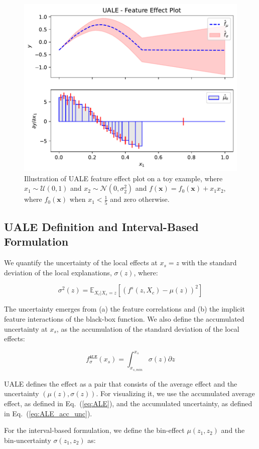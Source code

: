 \documentclass[twoside]{article}
\newcommand{\dfdx}{f^s}
\newcommand{\xb}{\mathbf{x}}
\begin{document}
\begin{figure}
  \centering
  \includegraphics[width=.4\textwidth]{concept_figure/fig-1.pdf}
  \caption{Illustration of UALE feature effect plot on a toy example,
    where \(x_1 \sim \mathcal{U}(0,1)\) and
    \(x_2 \sim \mathcal{N}(0,\sigma^2_2)\) and
    \(f(\xb)= f_0(\xb) + x_1x_2\), where \(f_0(\xb)\) when
    \(x_1 < \frac{1}{5}\) and zero otherwise.}
  \label{fig:UALE-figure}
\end{figure}

\subsection{UALE Definition and Interval-Based Formulation}
\label{sec:UALE-definition-1}

We quantify the uncertainty of the local effects at \(x_s=z\) with the standard deviation of the local explanations, \(\sigma(z)\), where:

\begin{equation}
  \label{eq:ALE_var}
  \sigma^2(z) = \mathbb{E}_{X_c|X_s=z}\left [ \left (\dfdx (z, X_c) - \mu(z) \right )^2 \right ] 
\end{equation}

\noindent
The uncertainty emerges from (a) the feature correlations and (b) the implicit feature interactions of the black-box function. We also define the accumulated uncertainty at \(x_s\), as the accumulation of the standard deviation of the local effects:

\begin{equation}
  \label{eq:ALE_acc_unc}
  f^{\mathtt{ALE}}_{\sigma}(x_s) = \int_{x_{s, min}}^{x_s} \sigma(z) \partial z
\end{equation}
\noindent

UALE defines the effect as a pair that consists of the average effect
and the uncertainty \((\mu(z), \sigma(z))\). For visualizing it, we
use the accumulated average effect, as defined in Eq.~(\ref{eq:ALE}),
and the accumulated uncertainty, as defined in
Eq.~(\ref{eq:ALE_acc_unc}). 


For the interval-based formulation, we define the bin-effect \(\mu(z_1, z_2)\) and the bin-uncertainty \(\sigma(z_1, z_2)\) as:
\end{document}
